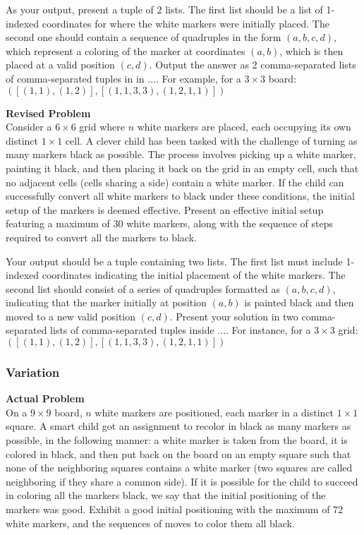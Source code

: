 As your output, present a tuple of 2 lists. The first list should be a list of 1-indexed coordinates for where the white markers were initially placed. The second one should contain a sequence of quadruples in the form $(a,b,c,d)$, which represent a coloring of the marker at coordinates $(a,b)$, which is then placed at a valid position $(c,d)$. Output the answer as 2 comma-separated lists of comma-separated tuples in in $\boxed{...}$. For example, for a $3\times 3$ board: $\boxed{([(1, 1), (1,2)], [(1,1,3,3), (1,2,1,1)])}$

\textbf{Revised Problem}\\
Consider a $6 \times 6$ grid where $n$ white markers are placed, each occupying its own distinct $1 \times 1$ cell. A clever child has been tasked with the challenge of turning as many markers black as possible. The process involves picking up a white marker, painting it black, and then placing it back on the grid in an empty cell, such that no adjacent cells (cells sharing a side) contain a white marker. If the child can successfully convert all white markers to black under these conditions, the initial setup of the markers is deemed effective. Present an effective initial setup featuring a maximum of $30$ white markers, along with the sequence of steps required to convert all the markers to black.

Your output should be a tuple containing two lists. The first list must include 1-indexed coordinates indicating the initial placement of the white markers. The second list should consist of a series of quadruples formatted as $(a,b,c,d)$, indicating that the marker initially at position $(a,b)$ is painted black and then moved to a new valid position $(c,d)$. Present your solution in two comma-separated lists of comma-separated tuples inside $\boxed{...}$. For instance, for a $3\times 3$ grid: $\boxed{([(1, 1), (1,2)], [(1,1,3,3), (1,2,1,1)])}$

\subsubsection{Variation}
\textbf{Actual Problem}\\
On a $9 \times 9$ board, $n$ white markers are positioned, each marker in a distinct $1 \times 1$ square. A smart child got an assignment to recolor in black as many markers as possible, in the following manner: a white marker is taken from the board, it is colored in black, and then put back on the board on an empty square such that none of the neighboring squares contains a white marker (two squares are called neighboring if they share a common side).
If it is possible for the child to succeed in coloring all the markers black, we say that the initial positioning of the markers was good. Exhibit a good initial positioning with the maximum of $72$ white markers, and the sequences of moves to color them all black.

